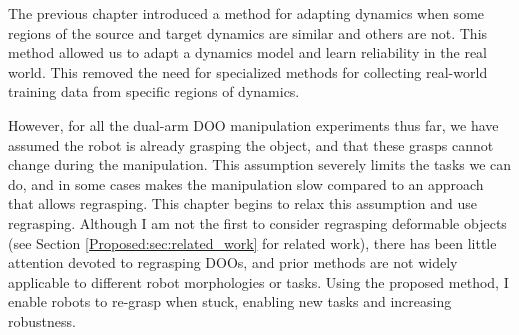 The previous chapter introduced a method for adapting dynamics when some regions of the source and target dynamics are similar and others are not. This method allowed us to adapt a dynamics model and learn reliability in the real world. This removed the need for specialized methods for collecting real-world training data from specific regions of dynamics.

However, for all the dual-arm DOO manipulation experiments thus far, we have assumed the robot is already grasping the object, and that these grasps cannot change during the manipulation. This assumption severely limits the tasks we can do, and in some cases makes the manipulation slow compared to an approach that allows regrasping. This chapter begins to relax this assumption and use regrasping. Although I am not the first to consider regrasping deformable objects (see Section \ref{Proposed:sec:related_work} for related work), there has been little attention devoted to regrasping DOOs, and prior methods are not widely applicable to different robot morphologies or tasks. Using the proposed method, I enable robots to re-grasp when stuck, enabling new tasks and increasing robustness.







